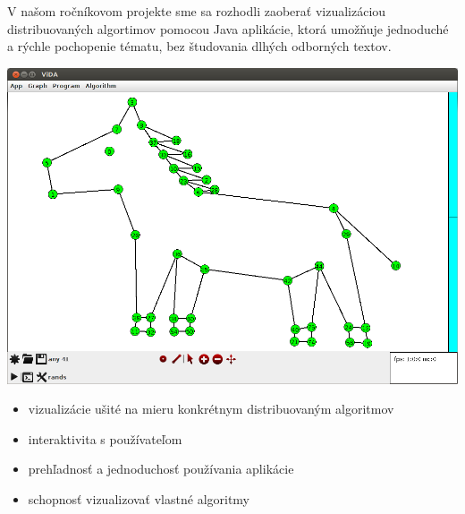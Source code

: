 
V našom ročníkovom projekte sme sa rozhodli zaoberať vizualizáciou distribuovaných algortimov
pomocou Java aplikácie, ktorá umožňuje jednoduché a rýchle pochopenie tématu, bez
študovania dlhých odborných textov.

\includegraphics[width=\columnwidth]{konik}

\begin{itemize}

    \item vizualizácie ušité na mieru konkrétnym distribuovaným algoritmov
    \item interaktivita s používateľom
    \item prehľadnosť a jednoduchosť používania aplikácie
    \item schopnosť vizualizovať vlastné algoritmy

\end{itemize}


